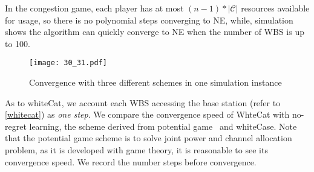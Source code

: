 In the congestion game, each player has at most $(n-1)*|\mathcal{C}|$ resources available for usage, so there is no polynomial steps converging to NE, while, simulation shows the algorithm can quickly converge to NE when the number of WBS is up to 100. 


\begin{figure}[h!]
  \centering
  \texttt{[image: 30\_31.pdf]}
  \caption{Convergence with three different schemes in one simulation instance}
\label{convergeComp}
\end{figure}


As to whiteCat, we account each WBS accessing the base station (refer to \ref{whitecat}) as \textit{one step}.
We compare the convergence speed of WhteCat with no-regret learning, the scheme derived from potential game~\cite{pimrc_2012} and whiteCase.
Note that the potential game scheme is to solve joint power and channel allocation problem, as it is developed with game theory, it is reasonable to see its convergence speed.
We record the number steps before convergence.


